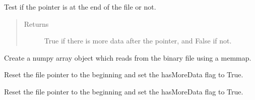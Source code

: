 \documentclass[letterpaper,10pt,english]{sphinxmanual}
\begin{document}
\begin{fulllineitems}
\begin{fulllineitems}
\begin{quote}
\begin{description}
\end{description}\end{quote}

\end{fulllineitems}


\begin{fulllineitems}
\label{common:common_data_importer.CommonBinaryFileDataImporter.has_more_data}
Test if the pointer is at the end of the file or not.
\begin{quote}\begin{description}
\item[{Returns}] \leavevmode
True if there is more data after the pointer, and False if not.

\end{description}\end{quote}

\end{fulllineitems}


\begin{fulllineitems}
\label{common:common_data_importer.CommonBinaryFileDataImporter.init_file_input_stream}
Create a numpy array object which reads from the binary file using a memmap.

\end{fulllineitems}


\begin{fulllineitems}
\label{common:common_data_importer.CommonBinaryFileDataImporter.rewind}
Reset the file pointer to the beginning and set the hasMoreData flag to True.

\end{fulllineitems}


\begin{fulllineitems}
\label{common:common_data_importer.CommonBinaryFileDataImporter.rewindPatch}
Reset the file pointer to the beginning and set the hasMoreData flag to True.


\end{fulllineitems}
\end{fulllineitems}
\end{document}
